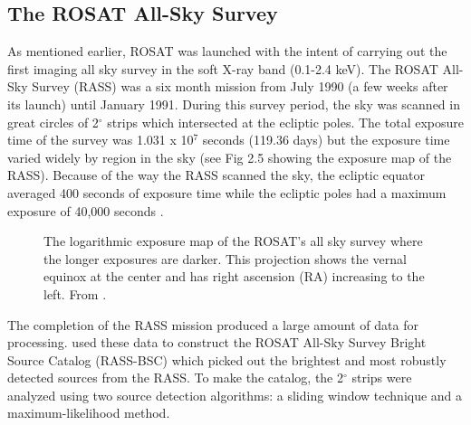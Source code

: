 \subsection{The ROSAT All-Sky Survey}


As mentioned earlier, ROSAT was launched with the intent of carrying out the first imaging all sky survey in the soft X-ray band (0.1-2.4 keV). 
The ROSAT All-Sky Survey (RASS) was a six month mission from July 1990 (a few weeks after its launch) until January 1991. 
During this survey period, the sky was scanned in great circles of 2$^{\circ}$ strips which intersected at the ecliptic poles. 
The total exposure time of the survey was 1.031 x 10$^7$ seconds (119.36 days) but the exposure time varied widely by region in the sky (see Fig 2.5 showing the exposure map of the RASS). 
Because of the way the RASS scanned the sky, the ecliptic equator averaged 400 seconds of exposure time while the ecliptic poles had a maximum exposure of 40,000 seconds \citep{voges1992}.




\begin{figure}[H]
\centering
{}
\caption{The logarithmic exposure map of the ROSAT's all sky survey where the longer exposures are darker. This projection shows the vernal equinox at the center and has right ascension (RA) increasing to the left. From \cite{Briel1996}. }
\label{imbeded_fb}
\end{figure}

The completion of the RASS mission produced a large amount of data for processing. 
\cite{voges1999} used these data to construct the ROSAT All-Sky Survey Bright Source Catalog (RASS-BSC) which picked out the brightest and most robustly detected sources from the RASS. 
To make the catalog, the 2$^{\circ}$ strips were analyzed using two source detection algorithms: a sliding window technique and a maximum-likelihood method. 

